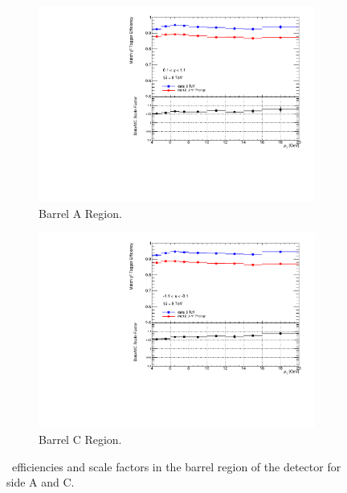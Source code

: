 \begin{figure}[htbp]
  \centering
  \begin{subfigure}[b]{0.85\textwidth}
    \includegraphics[width=\textwidth]{PartCalibration2012/Plots/SFPlots/Barrel_A_smt.pdf}
    \caption{Barrel A Region.} \label{fig:CalibrationScaleFactorBarrelA}
  \end{subfigure}
  
  \begin{subfigure}[b]{0.85\textwidth}
    \includegraphics[width=\textwidth]{PartCalibration2012/Plots/SFPlots/Barrel_C_smt.pdf}
    \caption{Barrel C Region.} \label{fig:CalibrationScaleFactorBarrelC}
  \end{subfigure}
  \caption{\xsm\ efficiencies and scale factors in the barrel region of the detector for side  A and  C.} \label{fig:CalibrationScaleFactorBarrel}
\end{figure}

